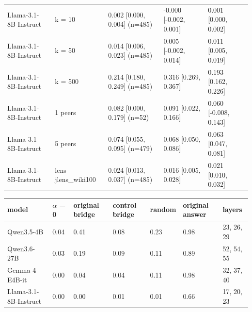 \begin{tabular}{lllll}
Llama-3.1-8B-Instruct & k = 10 & 0.002 [0.000, 0.004] (n=485) & -0.000 [-0.002, 0.001] & 0.001 [0.000, 0.002] \\
Llama-3.1-8B-Instruct & k = 50 & 0.014 [0.006, 0.023] (n=485) & 0.005 [-0.002, 0.014] & 0.011 [0.005, 0.019] \\
Llama-3.1-8B-Instruct & k = 500 & 0.214 [0.180, 0.249] (n=485) & 0.316 [0.269, 0.367] & 0.193 [0.162, 0.226] \\
Llama-3.1-8B-Instruct & 1 peers & 0.082 [0.000, 0.179] (n=52) & 0.091 [0.022, 0.166] & 0.060 [-0.008, 0.143] \\
Llama-3.1-8B-Instruct & 5 peers & 0.074 [0.055, 0.095] (n=479) & 0.068 [0.050, 0.086] & 0.063 [0.047, 0.081] \\
Llama-3.1-8B-Instruct & lens jlens\_wiki100 & 0.024 [0.013, 0.037] (n=485) & 0.016 [0.005, 0.028] & 0.021 [0.010, 0.032] \\
\bottomrule
\end{tabular}

\begin{tabular}{lllllll}
\toprule
model & $\alpha$ = 0 & original bridge & control bridge & random & original answer & layers \\
\midrule
Qwen3.5-4B & 0.04 & 0.41 & 0.08 & 0.23 & 0.98 & 23, 26, 29 \\
Qwen3.6-27B & 0.03 & 0.19 & 0.09 & 0.11 & 0.89 & 52, 54, 55 \\
Gemma-4-E4B-it & 0.00 & 0.04 & 0.04 & 0.11 & 0.98 & 32, 37, 40 \\
Llama-3.1-8B-Instruct & 0.00 & 0.00 & 0.01 & 0.01 & 0.66 & 17, 20, 23 \\
\bottomrule
\end{tabular}

